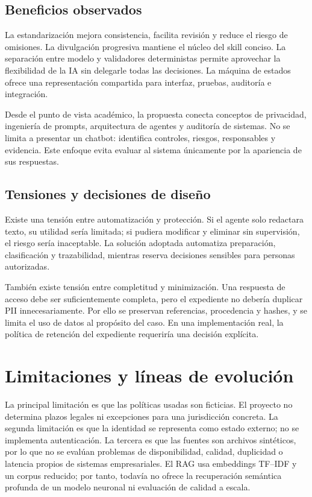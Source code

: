 \documentclass[11pt,a4paper]{article}
\begin{document}
\subsection{Beneficios observados}

La estandarización mejora consistencia, facilita revisión y reduce el riesgo de omisiones. La divulgación progresiva mantiene el núcleo del skill conciso. La separación entre modelo y validadores deterministas permite aprovechar la flexibilidad de la IA sin delegarle todas las decisiones. La máquina de estados ofrece una representación compartida para interfaz, pruebas, auditoría e integración.

Desde el punto de vista académico, la propuesta conecta conceptos de privacidad, ingeniería de prompts, arquitectura de agentes y auditoría de sistemas. No se limita a presentar un chatbot: identifica controles, riesgos, responsables y evidencia. Este enfoque evita evaluar al sistema únicamente por la apariencia de sus respuestas.

\subsection{Tensiones y decisiones de diseño}

Existe una tensión entre automatización y protección. Si el agente solo redactara texto, su utilidad sería limitada; si pudiera modificar y eliminar sin supervisión, el riesgo sería inaceptable. La solución adoptada automatiza preparación, clasificación y trazabilidad, mientras reserva decisiones sensibles para personas autorizadas.

También existe tensión entre completitud y minimización. Una respuesta de acceso debe ser suficientemente completa, pero el expediente no debería duplicar PII innecesariamente. Por ello se preservan referencias, procedencia y hashes, y se limita el uso de datos al propósito del caso. En una implementación real, la política de retención del expediente requeriría una decisión explícita.

\section{Limitaciones y líneas de evolución}

La principal limitación es que las políticas usadas son ficticias. El proyecto no determina plazos legales ni excepciones para una jurisdicción concreta. La segunda limitación es que la identidad se representa como estado externo; no se implementa autenticación. La tercera es que las fuentes son archivos sintéticos, por lo que no se evalúan problemas de disponibilidad, calidad, duplicidad o latencia propios de sistemas empresariales. El RAG usa embeddings TF--IDF y un corpus reducido; por tanto, todavía no ofrece la recuperación semántica profunda de un modelo neuronal ni evaluación de calidad a escala.
\end{document}
